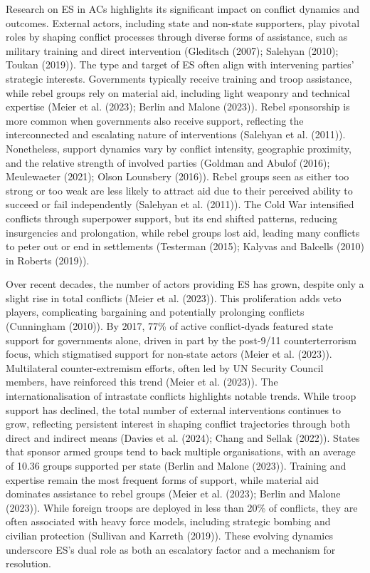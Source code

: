 \documentclass[
]{article}
\begin{document}
Research on ES in ACs highlights its significant impact on conflict
dynamics and outcomes. External actors, including state and non-state
supporters, play pivotal roles by shaping conflict processes through
diverse forms of assistance, such as military training and direct
intervention (Gleditsch (2007); Salehyan (2010); Toukan (2019)). The
type and target of ES often align with intervening parties' strategic
interests. Governments typically receive training and troop assistance,
while rebel groups rely on material aid, including light weaponry and
technical expertise (Meier et al. (2023); Berlin and Malone (2023)).
Rebel sponsorship is more common when governments also receive support,
reflecting the interconnected and escalating nature of interventions
(Salehyan et al. (2011)). Nonetheless, support dynamics vary by conflict
intensity, geographic proximity, and the relative strength of involved
parties (Goldman and Abulof (2016); Meulewaeter (2021); Olson Lounsbery
(2016)). Rebel groups seen as either too strong or too weak are less
likely to attract aid due to their perceived ability to succeed or fail
independently (Salehyan et al. (2011)). The Cold War intensified
conflicts through superpower support, but its end shifted patterns,
reducing insurgencies and prolongation, while rebel groups lost aid,
leading many conflicts to peter out or end in settlements (Testerman
(2015); Kalyvas and Balcells (2010) in Roberts (2019)).

Over recent decades, the number of actors providing ES has grown,
despite only a slight rise in total conflicts (Meier et al. (2023)).
This proliferation adds veto players, complicating bargaining and
potentially prolonging conflicts (Cunningham (2010)). By 2017, 77\% of
active conflict-dyads featured state support for governments alone,
driven in part by the post-9/11 counterterrorism focus, which
stigmatised support for non-state actors (Meier et al. (2023)).
Multilateral counter-extremism efforts, often led by UN Security Council
members, have reinforced this trend (Meier et al. (2023)). The
internationalisation of intrastate conflicts highlights notable trends.
While troop support has declined, the total number of external
interventions continues to grow, reflecting persistent interest in
shaping conflict trajectories through both direct and indirect means
(Davies et al. (2024); Chang and Sellak (2022)). States that sponsor
armed groups tend to back multiple organisations, with an average of
10.36 groups supported per state (Berlin and Malone (2023)). Training
and expertise remain the most frequent forms of support, while material
aid dominates assistance to rebel groups (Meier et al. (2023); Berlin
and Malone (2023)). While foreign troops are deployed in less than 20\%
of conflicts, they are often associated with heavy force models,
including strategic bombing and civilian protection (Sullivan and
Karreth (2019)). These evolving dynamics underscore ES's dual role as
both an escalatory factor and a mechanism for resolution.
\end{document}
